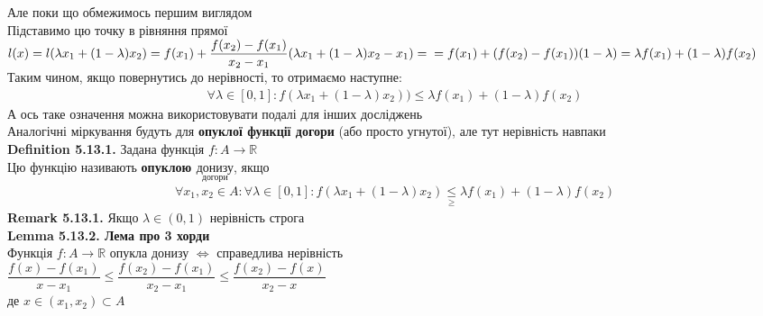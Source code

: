 \documentclass[a4paper, 14pt]{extarticle}
\def\bigline{\vspace{5mm}\\}
\def\defin#1{\textbf{Definition {#1}}}
\def\rm#1{\textbf{Remark {#1}}}
\def\lm#1{\textbf{Lemma {#1}}}
\def\bigline{\vspace{5mm}\\}
\begin{document}
Але поки що обмежимось першим виглядом\\
 Підставимо цю точку в рівняння прямої\\
$l(x) = l(\lambda x_1 + (1-\lambda) x_2) = f(x_1) + \dfrac{f(x_2)-f(x_1)}{x_2-x_1} (\lambda x_1 + (1-\lambda)x_2 - x_1) = \\
= f(x_1) + (f(x_2)-f(x_1))(1-\lambda) = \lambda f(x_1) + (1-\lambda)f(x_2)$\\
Таким чином, якщо повернутись до нерівності, то отримаємо наступне:
\begin{align*}
\forall \lambda \in [0,1]: f(\lambda x_1 + (1-\lambda)x_2)) \leq \lambda f(x_1) + (1-\lambda) f(x_2)
\end{align*}
А ось таке означення можна використовувати подалі для інших досліджень\\
Аналогічні міркування будуть для \textbf{опуклої функції догори} (або просто угнутої), але тут нерівність навпаки
\bigline
\defin{5.13.1.} Задана функція $f: A \to \mathbb{R}$\\
Цю функцію називають \textbf{опуклою $\underset{\textrm{догори}}{\textrm{донизу}}$}, якщо
\begin{align*}
\forall x_1,x_2 \in A: \forall \lambda \in [0,1]: f(\lambda x_1 + (1-\lambda)x_2) \underset{\geq}{\leq} \lambda f(x_1) + (1-\lambda)f(x_2)
\end{align*}
\rm{5.13.1.} Якщо $\lambda \in (0,1)$ нерівність строга
\bigline
\lm{5.13.2. Лема про 3 хорди}\\
Функція $f: A \to \mathbb{R}$ опукла донизу $\iff$ справедлива нерівність\\
$\dfrac{f(x)-f(x_1)}{x-x_1} \leq \dfrac{f(x_2)-f(x_1)}{x_2-x_1} \leq \dfrac{f(x_2)-f(x)}{x_2-x}$\\
де $x \in (x_1,x_2) \subset A$
\begin{figure}[H]
\centering
{}
\end{figure}
\end{document}
